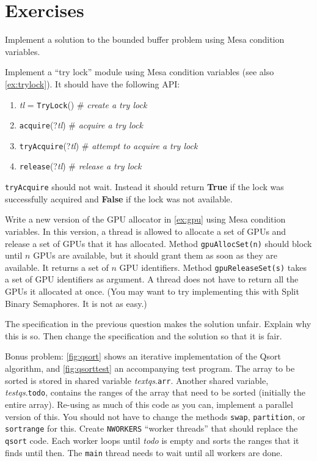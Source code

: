 \documentclass{report}
\begin{document}
\section*{Exercises}
\begin{problems}
\item \label{ex:bbmesa} Implement a solution to the bounded buffer problem using Mesa condition
variables.
\item Implement a ``try lock'' module using Mesa condition variables
(see also \autoref{ex:trylock}).  It should
have the following API:
\begin{enumerate}
\item \textit{tl} = \texttt{TryLock}() \# \emph{create a try lock}
\item \texttt{acquire}(?\textit{tl}) \# \emph{acquire a try lock}
\item \texttt{tryAcquire}(?\textit{tl}) \# \emph{attempt to acquire a try lock}
\item \texttt{release}(?\textit{tl}) \# \emph{release a try lock}
\end{enumerate}
\noindent
\texttt{tryAcquire} should not wait.
Instead it should return \textbf{True} if the lock was successfully
acquired and \textbf{False} if the lock was not available.
\item Write a new version of the GPU allocator in \autoref{ex:gpu}
using Mesa condition variables.
In this version,
a thread is allowed to allocate a set of GPUs and release a set of GPUs that it
has allocated.  Method \texttt{gpuAllocSet(n)} should block until $n$ GPUs are
available, but it should grant them as soon as they are available.
It returns a set of $n$ GPU identifiers.
Method \texttt{gpuReleaseSet(s)} takes a set of GPU identifiers as argument.
A thread does not have to return all the GPUs it allocated at once.
(You may want to try implementing this with Split Binary Semaphores.  It is not as easy.)
\item The specification in the previous question makes the solution unfair.
Explain why this is so.  Then change the specification and the solution so that
it is fair.
\item \label{ex:qsort}
Bonus problem: \autoref{fig:qsort} shows an iterative implementation of the Qsort
algorithm, and \autoref{fig:qsorttest} an accompanying test program.
The array to be sorted is stored in shared variable \textit{textqs}.\texttt{arr}.
Another shared variable, \textit{testqs}.\texttt{todo}, contains the ranges of the
array that need to be sorted (initially the entire array).
Re-using as much of this code as you can, implement a parallel version of
this.  You should not have to change the methods \texttt{swap}, \texttt{partition},
or \texttt{sortrange} for this.  Create \texttt{NWORKERS} ``worker threads''
that should replace the \texttt{qsort} code.
Each worker loops until \textit{todo}
is empty and sorts the ranges that it finds until then.  The \texttt{main}
thread needs to wait until all workers are done.
\end{problems}
\end{document}
